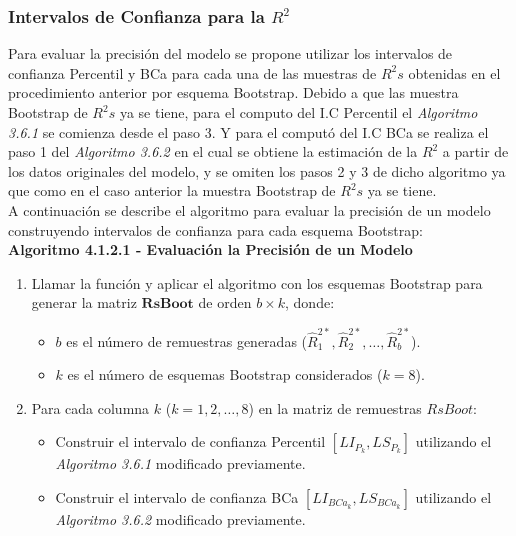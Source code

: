 \subsubsection{Intervalos de Confianza para la $R^{2}$}

Para evaluar la precisión del modelo se propone utilizar los intervalos de confianza Percentil y BCa para cada una de las muestras de $R^{2}s$ obtenidas en el procedimiento anterior por esquema Bootstrap. Debido a que las muestra Bootstrap de $R^{2}s$ ya se tiene, para el computo del I.C Percentil el \textit{Algoritmo 3.6.1} se comienza desde el paso 3. Y para el computó del I.C BCa se realiza el paso 1 del \textit{Algoritmo 3.6.2} en el cual se obtiene la estimación de la $R^{2}$ a partir de los datos originales del modelo, y se omiten los pasos 2 y 3 de dicho algoritmo ya que como en el caso anterior la muestra Bootstrap de $R^{2}s$ ya se tiene.\\



A continuación se describe el algoritmo para evaluar la precisión de un modelo construyendo intervalos de confianza para cada esquema Bootstrap:\\


\textbf{Algoritmo 4.1.2.1 - Evaluación la Precisión de un Modelo}

\begin{enumerate}
	
	\item Llamar la función y aplicar el algoritmo con los esquemas Bootstrap para generar la matriz \( \mathbf{RsBoot} \) de orden \( b \times k \), donde:
	\begin{itemize}
		\item \( b \) es el número de remuestras generadas (\( \hat{R}^{2*}_{1}, \hat{R}^{2*}_{2}, \dots, \hat{R}^{2*}_{b} \)).
		\item \( k \) es el número de esquemas Bootstrap considerados (\( k = 8 \)).
	\end{itemize}
	
	\item Para cada columna \( k \) (\( k = 1, 2, \dots, 8 \)) en la matriz de remuestras \( RsBoot \):
	\begin{itemize}
		\item Construir el intervalo de confianza Percentil \( [LI_{P_k}, LS_{P_k}] \) utilizando el \textit{Algoritmo 3.6.1} modificado previamente.
		\item Construir el intervalo de confianza BCa \( [LI_{BCa_k}, LS_{BCa_k}] \) utilizando el \textit{Algoritmo 3.6.2} modificado previamente.
	\end{itemize}
\end{enumerate}






